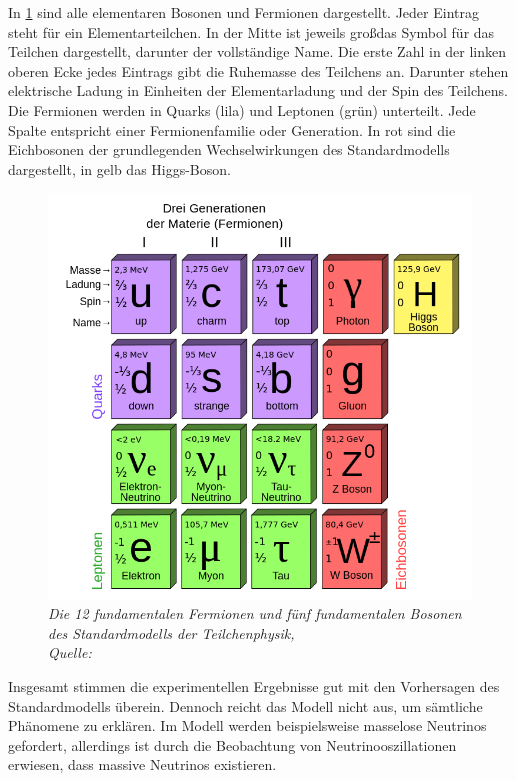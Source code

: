 In \ref{fig:Standardmodell} sind alle elementaren Bosonen und Fermionen dargestellt. Jeder Eintrag steht f\"ur ein Elementarteilchen. In der Mitte ist jeweils gro\ss  das Symbol f\"ur das Teilchen dargestellt, darunter der vollst\"andige Name. Die erste Zahl in der linken oberen Ecke jedes Eintrags gibt die Ruhemasse des Teilchens an. Darunter stehen elektrische Ladung in Einheiten der Elementarladung und der Spin des Teilchens. Die Fermionen werden in Quarks (lila) und Leptonen (gr\"un) unterteilt. Jede Spalte entspricht einer Fermionenfamilie oder Generation. In rot sind die Eichbosonen der grundlegenden Wechselwirkungen des Standardmodells dargestellt, in gelb das Higgs-Boson.

\begin{figure}[hhh]
 \begin{center}
   \includegraphics[width=\textwidth]{graphics/Standard_Model.png}
   \parbox[b]{12cm}{
     \caption[Standardmodell der Teilchenphysik]
             {\label{fig:Standardmodell} \it Die 12 fundamentalen Fermionen und f\"unf fundamentalen Bosonen des Standardmodells der Teilchenphysik,\\ Quelle: \cite{wiki:Standardmodell}}
   }
 \end{center}
\end{figure}

Insgesamt stimmen die experimentellen Ergebnisse gut mit den Vorhersagen des Standardmodells \"uberein. Dennoch reicht das Modell nicht aus, um s\"amtliche Ph\"anomene zu erkl\"aren. Im Modell werden beispielsweise masselose Neutrinos gefordert, allerdings ist durch die Beobachtung von Neutrinooszillationen erwiesen, dass massive Neutrinos existieren.

